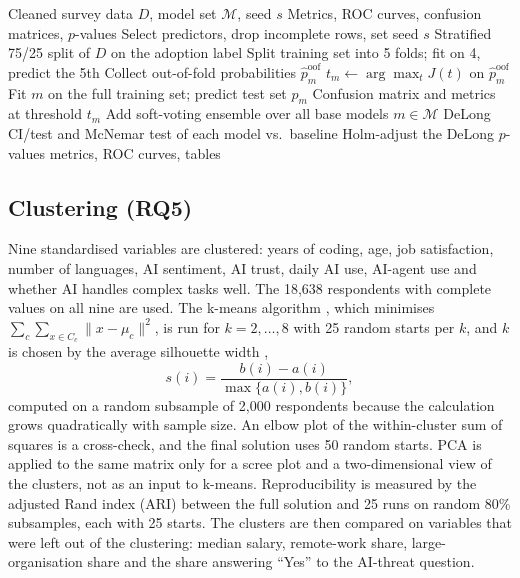 \documentclass[conference]{IEEEtran}
\begin{document}
\begin{algorithm}[t]
\caption{Model benchmark protocol}
\label{alg:bench}
\begin{algorithmic}[1]
\Require Cleaned survey data $D$, model set $\mathcal{M}$, seed $s$
\Ensure Metrics, ROC curves, confusion matrices, $p$-values
\State Select predictors, drop incomplete rows, set seed $s$
\State Stratified 75/25 split of $D$ on the adoption label
  \State Split training set into 5 folds; fit on 4, predict the 5th
  \State Collect out-of-fold probabilities $\hat p^{\text{oof}}_m$
  \State $t_m\gets\arg\max_t J(t)$ on $\hat p^{\text{oof}}_m$ 
  \State Fit $m$ on the full training set; predict test set $\hat p_m$
  \State Confusion matrix and metrics at threshold $t_m$
\EndFor
\State Add soft-voting ensemble over all base models $m\in\mathcal{M}$
\State DeLong CI/test and McNemar test of each model vs.\ baseline
\State Holm-adjust the DeLong $p$-values
\State \Return metrics, ROC curves, tables
\end{algorithmic}
\end{algorithm}

\subsection{Clustering (RQ5)}
Nine standardised variables are clustered: years of coding, age, job satisfaction, number of languages, AI sentiment, AI trust, daily AI use, AI-agent use and whether AI handles complex tasks well. The 18{,}638 respondents with complete values on all nine are used. The k-means algorithm \cite{macqueen1967}, which minimises $\sum_{c}\sum_{x\in C_c}\lVert x-\mu_c\rVert^2$, is run for $k=2,\dots,8$ with 25 random starts per $k$, and $k$ is chosen by the average silhouette width \cite{rousseeuw1987},
\begin{equation}
s(i)=\frac{b(i)-a(i)}{\max\{a(i),b(i)\}},
\end{equation}
computed on a random subsample of 2{,}000 respondents because the calculation grows quadratically with sample size. An elbow plot of the within-cluster sum of squares is a cross-check, and the final solution uses 50 random starts. PCA is applied to the same matrix only for a scree plot and a two-dimensional view of the clusters, not as an input to k-means. Reproducibility is measured by the adjusted Rand index (ARI) between the full solution and 25 runs on random 80\% subsamples, each with 25 starts. The clusters are then compared on variables that were left out of the clustering: median salary, remote-work share, large-organisation share and the share answering ``Yes'' to the AI-threat question.
\end{document}

